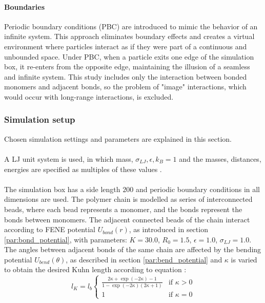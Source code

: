 \documentclass[
    paper=A4,pagesize=automedia,fontsize=12pt,
    BCOR=15mm,DIV=22,
    twoside,headinclude,footinclude=false,
    fleqn,             %
    bibliography=totocnumbered,          %
    listof=totoc,                %
    listof=flat,                 %
    cleardoublepage=empty      %
    numbers=endperiod
]{scrartcl}
\begin{document}
\paragraph{Boundaries}
Periodic boundary conditions (PBC) are introduced to mimic the behavior of an infinite system.
This approach eliminates boundary effects and creates a virtual environment where particles 
interact as if they were part of a continuous and unbounded space.
Under PBC, when a particle exits one edge of the simulation box, it re-enters from the opposite edge, 
maintaining the illusion of a seamless and infinite system. This study includes only the interaction
between bonded monomers and adjacent bonds, so the problem of "image" interactions, which would 
occur with long-range interactions, is excluded. 


\subsubsection{Simulation setup} \label{sec:simulation_setup}
Chosen simulation settings and parameters are explained in this section.
\\
\\
A LJ unit system is used, in which 
mass, $\sigma_{LJ}, \epsilon, k_B = 1$ and the masses, distances, energies are specified
as multiples of these values \cite{LAMMPS}.
\\
\\
The simulation box has a side length $200$ and periodic boundary conditions in all 
dimensions are used. The polymer chain is modelled as series of interconnected
beads, where each bead represents a monomer, and the bonds represent the bonds between monomers.
The adjacent connected beads of the chain interact according to FENE potential $U_{bond}(r)$,
as introduced in section \ref{par:bond_potential}, with parameters: 
$K=30.0$, $R_0=1.5$, $\epsilon=1.0$, $\sigma_{LJ}=1.0$.
The angles between adjacent bonds of the same chain are affected by the bending potential
$U_{bend}(\theta)$, as described in section \ref{par:bend_potential} and 
$\kappa$ is varied to obtain the
desired Kuhn length according to equation \cite{svaneborg_2020}:
\begin{equation}
    l_K = l_b 
    \begin{cases}
        \frac{2 \kappa + \exp(-2 \kappa) - 1}{1-\exp(-2\kappa)(2\kappa + 1)} & \text{if } \kappa > 0 \\
        1 & \text{if } \kappa = 0 
    \end{cases}
\end{equation}
\end{document}
